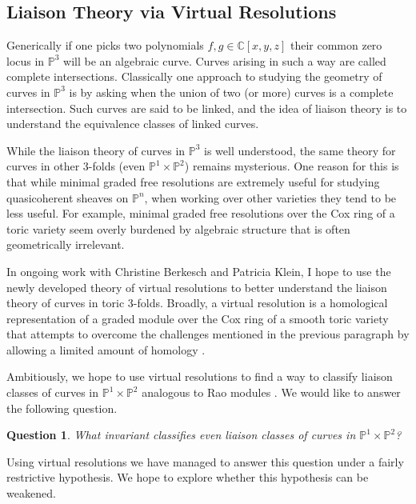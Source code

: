 \documentclass[11pt,reqno]{amsart}
\newtheorem{question}[lemma]{Question}
\theoremstyle{remark}
\newcommand{\C}{\mathbb{C}}
\renewcommand{\P}{\mathbb{P}}
\begin{document}
\subsection{Liaison Theory via Virtual Resolutions}

Generically if one picks two polynomials $f,g\in \C[x,y,z]$ their common zero locus in $\P^3$ will be an algebraic curve. Curves arising in such a way are called complete intersections. Classically one approach to studying the geometry of curves in $\P^3$ is by asking when the union of two (or more) curves is a complete intersection. Such curves are said to be linked, and the idea of liaison theory is to understand the equivalence classes of linked curves. 

While the liaison theory of curves in $\P^3$ is well understood, the same theory for curves in other 3-folds (even $\P^1\times\P^2$) remains mysterious. One reason for this is that while minimal graded free resolutions are  extremely useful for studying quasicoherent sheaves on $\P^n$, when working over other varieties  they tend to be less useful. For example, minimal graded free resolutions over the Cox ring of a toric variety seem overly burdened by algebraic structure that is often geometrically irrelevant. 

In ongoing work with Christine Berkesch and Patricia Klein, I hope to use the newly developed theory of virtual resolutions to better understand the liaison theory of curves in toric 3-folds. Broadly, a virtual resolution is a homological representation of a graded module over the Cox ring of a smooth toric variety that attempts to overcome the challenges mentioned in the previous paragraph by allowing a limited amount of homology \cite{berkeschErmanSmith17}. 


Ambitiously, we hope to use virtual resolutions to find a way to classify liaison classes of curves in $\P^1\times\P^2$ analogous to Rao modules \cite{rao78}. We would like to answer the following question. 
 
\begin{question}\label{quest:virtual-rao}
What invariant classifies even liaison classes of curves in $\P^1\times\P^2$?
\end{question}

Using virtual resolutions we have managed to answer this question under a fairly restrictive hypothesis. We hope to explore whether this hypothesis can be weakened. 
\end{document}
